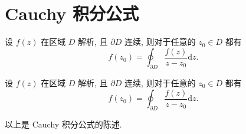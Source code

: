     \section{Cauchy 积分公式}
        \begin{theorem}
            设 $f\left(z\right)$ 在区域 $D$ 解析, 且 $\partial D$ 连续, 则对于任意的 $z_0\in D$ 都有
            $$
            f\left(z_0\right) = \oint_{\partial D}{\dfrac{f\left(z\right)}{z-z_0}\mathrm{d}z}.
            $$
        \end{theorem}
        \begin{theorem}[Weirestrass 定理]
            设 $f\left(z\right)$ 在区域 $D$ 解析, 且 $\partial D$ 连续, 则对于任意的 $z_0\in D$ 都有
            $$
            f\left(z_0\right) = \oint_{\partial D}{\dfrac{f\left(z\right)}{z-z_0}\mathrm{d}z}.
            $$
        \end{theorem}
        以上是 Cauchy 积分公式的陈述.